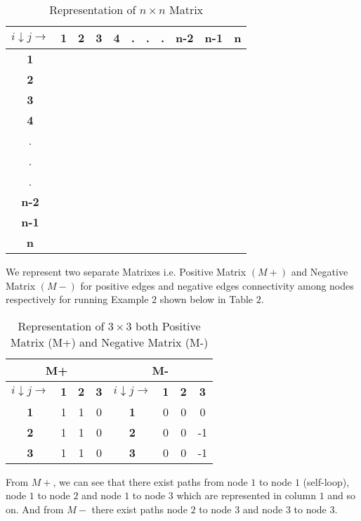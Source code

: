 \documentclass{article}
\begin{document}
\begin{table}[th]
\centering
\caption{Representation of $n \times n$ Matrix}
{\begin{tabular}{|c|c|c|c|c|c|c|c|c|c|c|}
\hline
\textbf{$i\downarrow j\longrightarrow $} & \textbf{1} & \textbf{2} & \textbf{3} & \textbf{4} & . & . & .& \textbf{n-2} & \textbf{n-1} &\textbf{n}\\
\hline 
\textbf{1} &  &   &  & & & & &  & &  \\
\hline 
\textbf{2} &  &   &  &  & & & &  & & \\
\hline 
\textbf{3} &  &   &  & & & & &  & &  \\
\hline 
\textbf{4} &  &   &  & & & & &  & &  \\
\hline 
.&  &   &  & & & & &  & &  \\
\hline
.&  &   &  & & & & &  & &  \\
\hline
.&  &   &  & & & & &  & &  \\
\hline
\textbf{n-2} &  &   &  &  & & & &  & &  \\
\hline
\textbf{n-1} &  &   &  &  & & & &  & &  \\
\hline
\textbf{n} &  &   &  &  & & & &  & &  \\
\hline
\end{tabular} }
\end{table} 
We represent two separate Matrixes i.e. Positive Matrix $(M+)$ and Negative Matrix $(M-)$ for positive edges and negative edges connectivity among nodes respectively for running Example $2$ shown below in Table $2$.
\begin{table}[th]
\centering
 \caption{Representation of $3 \times 3$ both Positive Matrix (M+) and Negative Matrix (M-)}
 {
  \begin{tabular}{|c|c|c|c|c|c|c|c|}
  \hline
  \multicolumn{4}{|c}{M+} & \multicolumn{4}{|c|}{M-} \\
  \hline
   $i\downarrow j\longrightarrow $ & \textbf{1} & \textbf{2} & \textbf{3} & $i\downarrow j\longrightarrow $ & \textbf{1} & \textbf{2} & \textbf{3} \\ \hline
   \textbf{1} & 1 & 1 & 0 & \textbf{1} & 0 & 0 & 0\\ \hline
   \textbf{2} & 1 & 1 & 0 & \textbf{2} & 0 & 0 & -1\\ \hline
   \textbf{3} & 1 & 1 & 0 & \textbf{3} & 0 & 0 & -1\\ \hline
  \end{tabular} }
  \end{table} 
 From $M+$, we can see that there exist  paths from node $1$ to node $1$ (self-loop), node $1$ to node $2$ and node $1$ to node $3$ which are represented in column $1$ and so on. And from $M-$ there exist paths node $2$ to node $3$ and node $3$ to node $3$.
\end{document}
